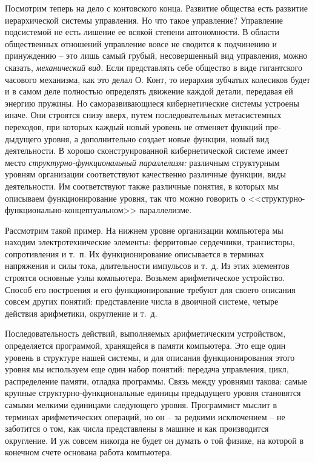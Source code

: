 \documentclass{book}
\begin{document}
Посмотрим теперь на дело с контовского конца. Развитие общества есть развитие иерархической системы управления. Но что такое управление? Управление подсистемой не есть лишение ее всякой степени автономности. В области общест­венных отношений управление вовсе не сводится к подчинению и принуждению -- это лишь самый грубый, несовершенный вид управления, можно сказать, \textit{механический вид.}  Если представ­лять себе общество в виде гигантского часового механизма, как это делал О. Конт, то иерархия зубчатых колесиков будет и в самом деле полностью определять движение каждой детали, передавая ей энергию пружины. Но саморазвивающиеся ки­бернетические системы устроены иначе. Они строятся снизу вверх, путем последовательных метасистемных переходов, при которых каждый новый уровень не отменяет функций пре­дыдущего уровня, а дополнительно создает новые функции, новый вид деятельности. В хорошо сконструированной кибер­нетической системе имеет место \textit{структурно-функциональный параллелизм:}  различным структурным уровням 
организации соответствуют качественно различные функции, виды деятель­ности. Им соответствуют также различные понятия, в которых мы описываем функционирование уровня, так что можно гово­рить о <<структурно-функционально-концептуальном>> паралле­лизме.

Рассмотрим такой пример. На нижнем уровне организации компьютера мы находим электротехнические элементы: ферритовые сердечники, транзисторы, сопротивления и т.~п. Их функционирование описывается в терминах напряжения и си­лы тока, длительности импульсов и т.~д. Из этих элементов строятся основные узлы компьютера. Возьмем арифметическое устройство. Способ его построения и его функционирова­ние требуют для своего описания совсем других понятий: пред­ставление числа в двоичной системе, четыре действия арифметики, округление и т.~д.

Последовательность действий, выполняемых арифметическим устройством, определяется программой, хранящейся в памяти компьютера. Это еще один уровень в структуре нашей системы, и для описания функционирования этого уровня мы использу­ем еще один набор понятий: передача управления, цикл, распределение памяти, отладка программы. Связь между уровнями такова: самые крупные структурно-функциональные единицы предыдущего уровня становятся самыми мелкими единицами следующего уровня. Программист мыслит в терминах арифметических операций, но он -- за редкими исключением -- не заботится о том, как числа представлены в машине и как производится округление. И уж совсем никогда не будет он думать о той физике, на которой в конечном счете основана работа компьютера.
\end{document}
